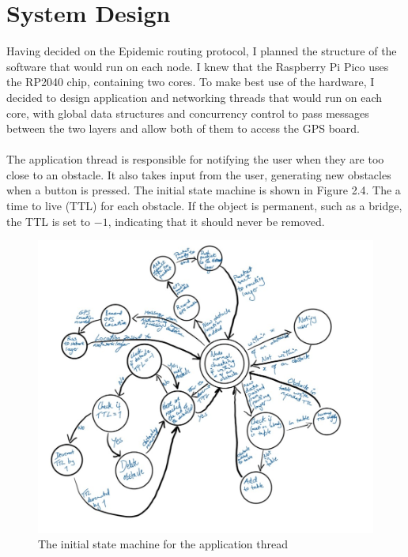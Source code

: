 \documentclass[12pt,a4paper]{report}
\begin{document}

\section{System Design}
Having decided on the Epidemic routing protocol, I planned the structure of the software that would run on each node. I knew that the Raspberry Pi Pico uses the RP2040 chip, containing two cores. To make best use of the hardware, I decided to design application and networking threads that would run on each core, with global data structures and concurrency control to pass messages between the two layers and allow both of them to access the GPS board. \\ \\
The application thread is responsible for notifying the user when they are too close to an obstacle. It also takes input from the user, generating new obstacles when a button is pressed. The initial state machine is shown in Figure 2.4. The a time to live (TTL) for each obstacle. If the object is permanent, such as a bridge, the TTL is set to $-1$, indicating that it should never be removed.
\begin{figure}[h]
\begin{center}
\caption{The initial state machine for the application thread}
\includegraphics[scale=0.5]{appThread.jpg}
\end{center}
\end{figure}
\end{document}

